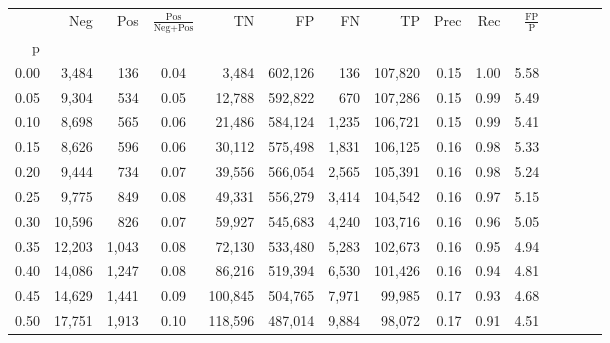 \begin{tabular}{rrrcrrrrrrrrrrr}
\toprule
{} &     Neg &     Pos & $\frac{\text{Pos}}{\text{Neg}+\text{Pos}}$ &       TN &       FP &       FN &       TP &  Prec &   Rec & $\frac{\text{FP}}{\text{P}}$ \\
p    &         &         &                                            &          &          &          &          &       &       &                              \\
\midrule
0.00 &   3,484 &     136 &                                       0.04 &    3,484 &  602,126 &      136 &  107,820 &  0.15 &  1.00 &                         5.58 \\
0.05 &   9,304 &     534 &                                       0.05 &   12,788 &  592,822 &      670 &  107,286 &  0.15 &  0.99 &                         5.49 \\
0.10 &   8,698 &     565 &                                       0.06 &   21,486 &  584,124 &    1,235 &  106,721 &  0.15 &  0.99 &                         5.41 \\
0.15 &   8,626 &     596 &                                       0.06 &   30,112 &  575,498 &    1,831 &  106,125 &  0.16 &  0.98 &                         5.33 \\
0.20 &   9,444 &     734 &                                       0.07 &   39,556 &  566,054 &    2,565 &  105,391 &  0.16 &  0.98 &                         5.24 \\
0.25 &   9,775 &     849 &                                       0.08 &   49,331 &  556,279 &    3,414 &  104,542 &  0.16 &  0.97 &                         5.15 \\
0.30 &  10,596 &     826 &                                       0.07 &   59,927 &  545,683 &    4,240 &  103,716 &  0.16 &  0.96 &                         5.05 \\
0.35 &  12,203 &   1,043 &                                       0.08 &   72,130 &  533,480 &    5,283 &  102,673 &  0.16 &  0.95 &                         4.94 \\
0.40 &  14,086 &   1,247 &                                       0.08 &   86,216 &  519,394 &    6,530 &  101,426 &  0.16 &  0.94 &                         4.81 \\
0.45 &  14,629 &   1,441 &                                       0.09 &  100,845 &  504,765 &    7,971 &   99,985 &  0.17 &  0.93 &                         4.68 \\
0.50 &  17,751 &   1,913 &                                       0.10 &  118,596 &  487,014 &    9,884 &   98,072 &  0.17 &  0.91 &                         4.51 \\

\end{tabular}
